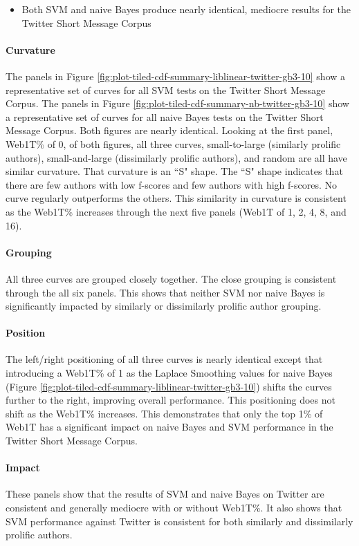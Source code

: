 	\begin{itemize}
	\item Both SVM and naive Bayes produce nearly identical, mediocre results for the Twitter Short Message Corpus
	\end{itemize}
	
		\paragraph*{Curvature}  The panels in Figure \ref{fig:plot-tiled-cdf-summary-liblinear-twitter-gb3-10} show a representative set of curves for all SVM tests on the Twitter Short Message Corpus.  The panels in Figure \ref{fig:plot-tiled-cdf-summary-nb-twitter-gb3-10} show a representative set of curves for all naive Bayes tests on the Twitter Short Message Corpus. Both figures are nearly identical.  Looking at the first panel, Web1T\% of 0, of both figures, all three curves, small-to-large (similarly prolific authors), small-and-large (dissimilarly prolific authors), and random are all have similar curvature.  That curvature is an ``S" shape. The ``S" shape indicates that there are few authors with low f-scores and few authors with high f-scores. No curve regularly outperforms the others. This similarity in curvature is consistent as the Web1T\% increases through the next five panels (Web1T of 1, 2, 4, 8, and 16). 
		\paragraph*{Grouping} All three curves are grouped closely together.  The close grouping is consistent through the all six panels.  This shows that neither SVM nor naive Bayes is significantly impacted by similarly or dissimilarly prolific author grouping. 
		\paragraph*{Position} The left/right positioning of all three curves is nearly identical except that introducing a Web1T\% of 1 as the Laplace Smoothing values for naive Bayes (Figure \ref{fig:plot-tiled-cdf-summary-liblinear-twitter-gb3-10}) shifts the curves further to the right, improving overall performance.  This positioning does not shift as the Web1T\% increases.  This demonstrates that only the top 1\% of Web1T has a significant impact on naive Bayes and SVM performance in the Twitter Short Message Corpus.
		\paragraph*{Impact} These panels show that the results of SVM and naive Bayes on Twitter are consistent and generally mediocre with or without Web1T\%.  It also shows that SVM performance against Twitter is consistent for both similarly and dissimilarly prolific authors.

